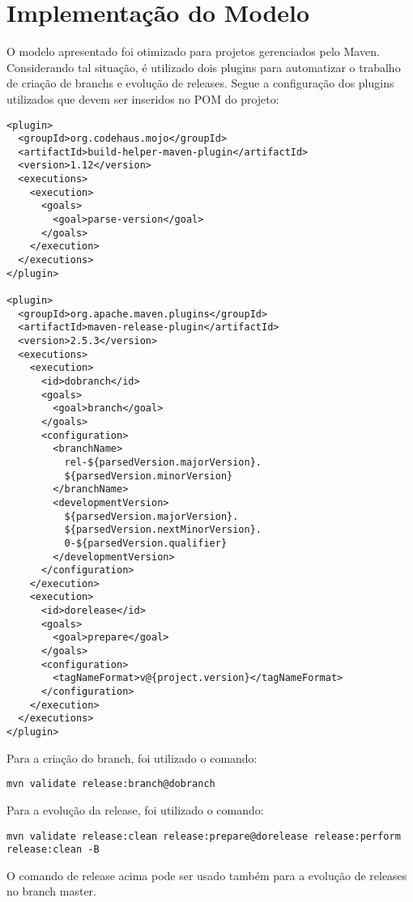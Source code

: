 \section{Implementa{\c c}{\~a}o do Modelo}
\label{sec:implmodelo}
O modelo apresentado foi otimizado para projetos gerenciados pelo Maven. Considerando tal situa{\c c}{\~a}o, {\'e} utilizado dois plugins para automatizar o trabalho de cria{\c c}{\~a}o de branchs e evolu{\c c}{\~a}o de releases. Segue a configura{\c c}{\~a}o dos plugins utilizados que devem ser inseridos no POM do projeto:

\begin{verbatim}
<plugin>
  <groupId>org.codehaus.mojo</groupId>
  <artifactId>build-helper-maven-plugin</artifactId>
  <version>1.12</version>
  <executions>
    <execution>
      <goals>
        <goal>parse-version</goal>
      </goals>
    </execution>
  </executions>
</plugin>

<plugin>
  <groupId>org.apache.maven.plugins</groupId>
  <artifactId>maven-release-plugin</artifactId>
  <version>2.5.3</version>
  <executions>
    <execution>
      <id>dobranch</id>
      <goals>
        <goal>branch</goal>
      </goals>
      <configuration>
        <branchName>
          rel-${parsedVersion.majorVersion}.
          ${parsedVersion.minorVersion}
        </branchName>
        <developmentVersion>
          ${parsedVersion.majorVersion}.
          ${parsedVersion.nextMinorVersion}.
          0-${parsedVersion.qualifier} 
        </developmentVersion>
      </configuration>
    </execution>
    <execution>
      <id>dorelease</id>
      <goals>
        <goal>prepare</goal>
      </goals>
      <configuration>
        <tagNameFormat>v@{project.version}</tagNameFormat>
      </configuration>
    </execution>
  </executions>
</plugin>
\end{verbatim}

Para a cria{\c c}{\~a}o do branch, foi utilizado o comando:

\begin{verbatim}
mvn validate release:branch@dobranch
\end{verbatim}

Para a evolu{\c c}{\~a}o da release, foi utilizado o comando:

\begin{verbatim}
mvn validate release:clean release:prepare@dorelease release:perform release:clean -B
\end{verbatim}

O comando de release acima pode ser usado tamb{\'e}m para a evolu{\c c}{\~a}o de releases no branch master.